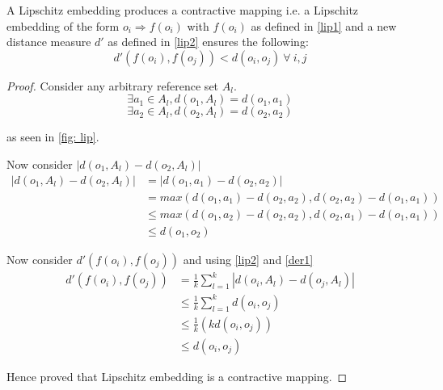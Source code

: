 \begin{thm}
\label{th0}
A Lipschitz embedding produces a contractive mapping i.e. a Lipschitz embedding of the form $o_i \Rightarrow f(o_i)$ with $f(o_i)$ as defined in \autoref{lip1} and a new distance measure $d'$ as defined in \autoref{lip2} ensures the following:\\

\begin{equation}
	d'(f(o_i),f(o_j)) < d(o_i, o_j)~ \forall ~ i,j
\end{equation} 

\end{thm}

\begin{proof}
	
Consider any arbitrary reference set $A_l$.\\
\begin{equation}
\exists a_1 \in A_l, d(o_1, A_l) = d(o_1, a_1)
\end{equation}
\begin{equation}
\exists a_2 \in A_l, d(o_2, A_l) = d(o_2, a_2)
\end{equation}

as seen in \autoref{fig: lip}.

Now consider $|d(o_1, A_l)-d(o_2, A_l)|$\\

\begin{equation}
\label{der1}
\begin{split}
|d(o_1, A_l)-d(o_2, A_l)| & = |d(o_1, a_1)-d(o_2, a_2)|  \\
 					& = max(d(o_1, a_1)-d(o_2, a_2),d(o_2, a_2)-d(o_1, a_1))\\
 					& \leq  max(d(o_1, a_2)-d(o_2, a_2),d(o_2, a_1)-d(o_1, a_1))\\
 					& \leq d(o_1,o_2)
\end{split}
\end{equation}

Now consider $d'(f(o_i),f(o_j))$ and using \autoref{lip2} and \autoref{der1}\\

\begin{equation}
\label{der2}
\begin{split}
d'(f(o_i),f(o_j)) & = \frac{1}{k} \sum \limits_{l=1}^{k} | d(o_i,A_l)-d(o_j,A_l)| \\
				& \leq \frac{1}{k} \sum \limits_{l=1}^{k} d(o_i,o_j) \\
				& \leq \frac{1}{k} (k d(o_i,o_j)) \\
				& \leq d(o_i,o_j)
\end{split}
\end{equation}

Hence proved that Lipschitz embedding is a contractive mapping.
\end{proof}

